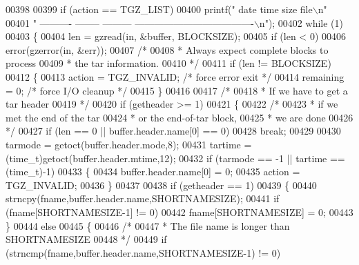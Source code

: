 \begin{DoxyCode}
{{{{00398 
00399   \textcolor{keywordflow}{if} (action == TGZ\_LIST)
00400     printf(\textcolor{stringliteral}{"    date      time     size                       file\(\backslash\)n"}
00401            \textcolor{stringliteral}{" ---------- -------- --------- -------------------------------------\(\backslash\)n"});
00402   \textcolor{keywordflow}{while} (1)
00403     \{
00404       len = gzread(in, &buffer, BLOCKSIZE);
00405       \textcolor{keywordflow}{if} (len < 0)
00406         error(gzerror(in, &err));
00407       \textcolor{comment}{/*}
00408 \textcolor{comment}{       * Always expect complete blocks to process}
00409 \textcolor{comment}{       * the tar information.}
00410 \textcolor{comment}{       */}
00411       \textcolor{keywordflow}{if} (len != BLOCKSIZE)
00412         \{
00413           action = TGZ\_INVALID; \textcolor{comment}{/* force error exit */}
00414           remaining = 0;        \textcolor{comment}{/* force I/O cleanup */}
00415         \}
00416 
00417       \textcolor{comment}{/*}
00418 \textcolor{comment}{       * If we have to get a tar header}
00419 \textcolor{comment}{       */}
00420       \textcolor{keywordflow}{if} (getheader >= 1)
00421         \{
00422           \textcolor{comment}{/*}
00423 \textcolor{comment}{           * if we met the end of the tar}
00424 \textcolor{comment}{           * or the end-of-tar block,}
00425 \textcolor{comment}{           * we are done}
00426 \textcolor{comment}{           */}
00427           \textcolor{keywordflow}{if} (len == 0 || buffer.header.name[0] == 0)
00428             \textcolor{keywordflow}{break};
00429 
00430           tarmode = getoct(buffer.header.mode,8);
00431           tartime = (time\_t)getoct(buffer.header.mtime,12);
00432           \textcolor{keywordflow}{if} (tarmode == -1 || tartime == (time\_t)-1)
00433             \{
00434               buffer.header.name[0] = 0;
00435               action = TGZ\_INVALID;
00436             \}
00437 
00438           \textcolor{keywordflow}{if} (getheader == 1)
00439             \{
00440               strncpy(fname,buffer.header.name,SHORTNAMESIZE);
00441               \textcolor{keywordflow}{if} (fname[SHORTNAMESIZE-1] != 0)
00442                   fname[SHORTNAMESIZE] = 0;
00443             \}
00444           \textcolor{keywordflow}{else}
00445             \{
00446               \textcolor{comment}{/*}
00447 \textcolor{comment}{               * The file name is longer than SHORTNAMESIZE}
00448 \textcolor{comment}{               */}
00449               \textcolor{keywordflow}{if} (strncmp(fname,buffer.header.name,SHORTNAMESIZE-1) != 0)
}}}}
\end{DoxyCode}
